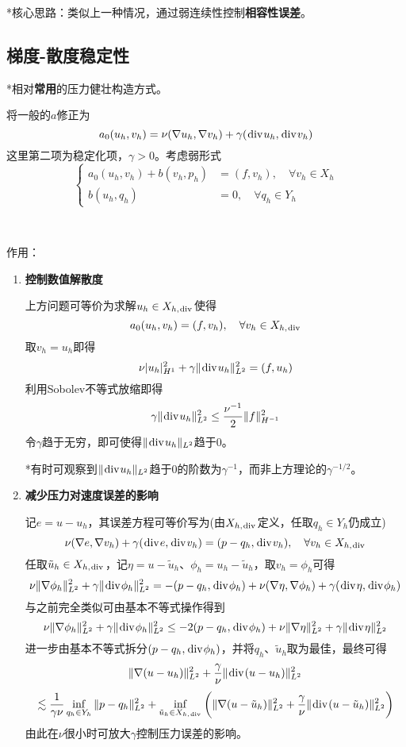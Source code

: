 \documentclass[a4paper,UTF8,fontset=windows]{ctexart}
\renewcommand*{\div}{\hspace{0.07em}\mathrm{div}\hspace{0.07em}}
\begin{document}
*核心思路：类似上一种情况，通过弱连续性控制\textbf{相容性误差}。

\subsection{梯度-散度稳定性}
*相对\textbf{常用}的压力健壮构造方式。

将一般的$a$修正为
$$a_0(u_h,v_h)=\nu(\nabla u_h,\nabla v_h)+\gamma(\div u_h,\div v_h)$$
这里第二项为稳定化项，$\gamma>0$。考虑弱形式
$$\begin{cases}a_0(u_h,v_h)+b(v_h,p_h)&=(f,v_h),\quad\forall v_h\in X_h\\b(u_h,q_h)&=0,\quad\forall q_h\in Y_h\end{cases}$$

\

作用：
\begin{enumerate}
    \item \textbf{控制数值解散度}
    
    上方问题可等价为求解$u_h\in X_{h,\div}$使得
    $$a_0(u_h,v_h)=(f,v_h),\quad\forall v_h\in X_{h,\div}$$
    取$v_h=u_h$即得
    $$\nu|u_h|_{H^1}^2+\gamma\|\div u_h\|_{L^2}^2=(f,u_h)$$
    利用Sobolev不等式放缩即得
    $$\gamma\|\div u_h\|_{L^2}^2\le\frac{\nu^{-1}}{2}\|f\|_{H^{-1}}^2$$
    令$\gamma$趋于无穷，即可使得$\|\div u_h\|_{L^2}$趋于0。
    
    *有时可观察到$\|\div u_h\|_{L^2}$趋于0的阶数为$\gamma^{-1}$，而非上方理论的$\gamma^{-1/2}$。

    \item \textbf{减少压力对速度误差的影响}

    记$e=u-u_h$，其误差方程可等价写为(由$X_{h,\div}$定义，任取$q_h\in Y_h$仍成立)
    $$\nu(\nabla e,\nabla v_h)+\gamma(\div e,\div v_h)=(p-q_h,\div v_h),\quad\forall v_h\in X_{h,\div}$$
    任取$\tilde{u}_h\in X_{h,\div}$，记$\eta=u-\tilde{u}_h$、$\phi_h=u_h-\tilde{u}_h$，取$v_h=\phi_h$可得
    $$\nu\|\nabla\phi_h\|_{L^2}^2+\gamma\|\div\phi_h\|_{L^2}^2=-(p-q_h,\div\phi_h)+\nu(\nabla\eta,\nabla\phi_h)+\gamma(\div\eta,\div\phi_h)$$
    与之前完全类似可由基本不等式操作得到
    $$\nu\|\nabla\phi_h\|_{L^2}^2+\gamma\|\div\phi_h\|_{L^2}^2\le-2(p-q_h,\div\phi_h)+\nu\|\nabla\eta\|_{L^2}^2+\gamma\|\div\eta\|_{L^2}^2$$
    进一步由基本不等式拆分$(p-q_h,\div\phi_h)$，并将$q_h$、$\tilde{u}_h$取为最佳，最终可得
    $$\|\nabla(u-u_h)\|_{L^2}^2+\frac{\gamma}{\nu}\|\div(u-u_h)\|_{L^2}^2$$
    $$\lesssim\frac{1}{\gamma\nu}\inf_{q_h\in Y_h}\|p-q_h\|_{L^2}^2+\inf_{\tilde{u}_h\in X_{h,\div}}\bigg(\|\nabla(u-\tilde{u}_h)\|_{L^2}^2+\frac{\gamma}{\nu}\|\div(u-\tilde{u}_h)\|_{L^2}^2\bigg)$$
    由此在$\nu$很小时可放大$\gamma$控制压力误差的影响。
\end{enumerate}
\end{document}
